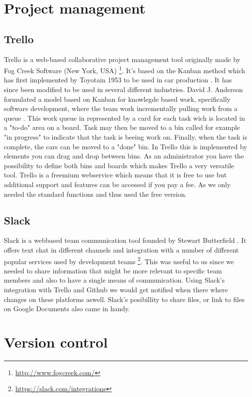 \documentclass[11pt,a4paper,titlepage,oneside]{report}
\begin{document}
\section{Project management}
  \subsection{Trello}
Trello is a web-based collaborative project management tool originally made by Fog Creek Software (New York, USA) \footnote{\url{http://www.fogcreek.com/}}. 
It's based on the Kanban method which has first implemented by Toyotain 1953 to be used in car production \cite{wiki-kanban}. It has since been modified to be used in several different industries. 
David J. Anderson formulated a model based on Kanban for knowlegde based work, specifically software development, where the team work incrementally pulling work from a queue \cite{da2004}. 
This work queue in represented by a card for each task wich is located in a "to-do" area on a board. Task may then be moved to a bin called for example "in progress" to indicate that the task is beeing work on. Finally, when the task is complete, the cars can be moved to a "done" bin. In Trello this is implemented by elements you can drag and drop between bins. As an administrator you have the possibility to define both bins and boards which makes Trello a very versatile tool.  
Trello is a freemium webservice which means that it is free to use but additional support and features can be accessed if you pay a fee. As we only needed the standard functions and thus used the free version.
  \subsection{Slack}
Slack is a webbased team communication tool founded by Stewart Butterfield
\cite{wiki_slack}. It offers text chat in different channels and integration with a number of different popular services used by development teams \footnote{\url{https://slack.com/integrations}}. This was useful to us since we needed to share information that might be more relevant to specific team members and also to have a single means of communication. Using Slack's integration with Trello and Github we would get notified when there where changes on these platforms aswell. Slack's posibillity to share files, or link to files on Google Documents also came in handy.

\section{Version control}
\end{document}
